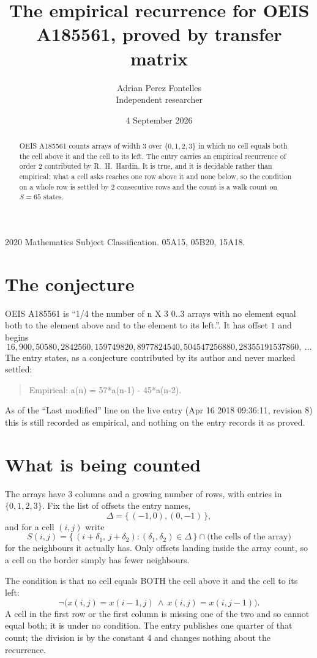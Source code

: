\documentclass[11pt,a4paper]{article}
\title{The empirical recurrence for OEIS A185561, proved by transfer matrix}
\author{Adrian Perez Fontelles\\ \small Independent researcher}
\date{4 September 2026}
\theoremstyle{plain}
\theoremstyle{definition}
\begin{document}
\maketitle

\begin{abstract}
OEIS A185561 counts arrays of width $3$ over $\{0,1,2,3\}$ in which no cell equals both the cell above it and the cell to its left. The entry carries an
empirical recurrence of order $2$ contributed by R.~H.~Hardin. It is true, and it is
decidable rather than empirical: what a cell asks reaches one row above
it and none below, so the condition on a whole row is settled by
$2$ consecutive rows and the count is a walk count on $S=65$ states.
\end{abstract}

\noindent\small 2020 Mathematics Subject Classification. 05A15, 05B20, 15A18.\normalsize

\section{The conjecture}

OEIS A185561 is ``1/4 the number of n X 3 0..3 arrays with no element equal both to the element above and to the element to its left.''. It has offset $1$ and begins
\[
16, 900, 50580, 2842560, 159749820, 8977824540, 504547256880, 28355191537860,\ \dots
\]
The entry states, as a conjecture contributed by its author and never marked settled:
\begin{quote}
Empirical: a(n) = 57*a(n-1) - 45*a(n-2).
\end{quote}
As of the ``Last modified'' line on the live entry (Apr 16 2018 09:36:11, revision 8) this is still
recorded as empirical, and nothing on the entry records it as proved.

\section{What is being counted}

The arrays have $3$ columns and a growing number of rows, with entries in $\{0,1,2,3\}$. Fix the
list of offsets the entry names,
\[
\Delta=\{\,(-1,0), (0,-1)\,\},
\]
and for a cell $(i,j)$ write
\[
S(i,j)=\{\,(i+\delta_1,\,j+\delta_2) : (\delta_1,\delta_2)\in\Delta\,\}\cap
\text{(the cells of the array)}
\]
for the neighbours it actually has. Only offsets landing inside the array count, so a cell on
the border simply has fewer neighbours.

The condition is that no cell equals BOTH the cell above it and the cell to its left:
\[
\neg\bigl(x(i,j)=x(i-1,j)\ \wedge\ x(i,j)=x(i,j-1)\bigr).
\]
A cell in the first row or the first column is missing one of the two and so cannot equal both; it is under no condition. The entry publishes one quarter of that count; the division is by the constant 4 and changes nothing about the recurrence.
\end{document}
